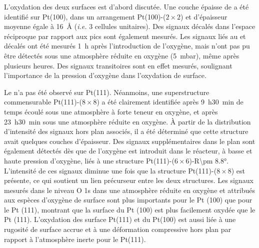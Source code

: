 {L'oxydation des deux surfaces est d'abord discutée.
Une couche épaisse de  a été identifié sur Pt(100), dans un arrangement Pt(100)-($2\times2$) et d'épaisseur moyenne égale à \qty{16}{\angstrom} (\textit{i.e.} 3 cellules unitaires).
Des signaux décalés dans l'espace réciproque par rapport aux pics  sont également mesurés.
Les signaux liés au  et décalés ont été mesurés \qty{1}{\hour} après l'introduction de l'oxygène, mais n'ont pas pu être détectés sous une atmosphère réduite en oxygène (\qty{5}{\milli\bar}), même après plusieurs heures.
Des signaux transitoires sont en effet mesurés, soulignant l’importance de la pression d’oxygène dans l’oxydation de surface.

Le  n'a pas été observé sur Pt(111).
Néanmoins, une superstructure commensurable Pt(111)-($8\times8$) a été clairement identifiée après \qty{9}{\hour}\qty{30}{\minute} de temps écoulé sous une atmosphère à forte teneur en oxygène, et après \qty {23}{\hour}\qty{30}{\minute} sous une atmosphère réduite en oxygène.
À partir de la distribution d’intensité des signaux hors plan associés, il a été déterminé que cette structure avait quelques couches d’épaisseur.
Des signaux supplémentaires dans le plan sont également détectés dès que de l'oxygène est introduit dans le réacteur, à basse et haute pression d'oxygène, liés à une structure Pt(111)-($6\times6$)-R\ang{\pm 8.8}.
L'intensité de ces signaux diminue une fois que la structure Pt(111)-($8\times8$) est présente, ce qui soutient un lien précurseur entre les deux structures.
Les signaux mesurés dans le niveau O 1s dans une atmosphère réduite en oxygène et attribués aux espèces d'oxygène de surface sont plus importants pour le Pt (100) que pour le Pt (111), montrant que la surface du Pt (100) est plus facilement oxydée que le Pt (111).
L'oxydation des surface Pt(111) et du Pt(100) est aussi liée à une rugosité de surface accrue et à une déformation compressive hors plan par rapport à l'atmosphère inerte pour le Pt(111).

}
